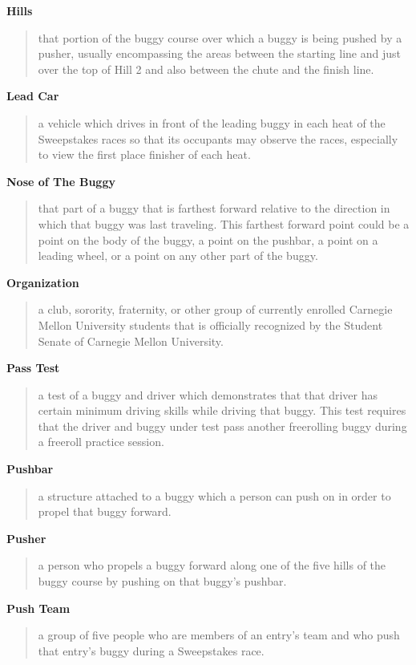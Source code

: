 \documentclass[openany]{book}
\begin{document}
\textbf{Hills}
\begin{quote}
	that portion of the buggy course over which a buggy is being pushed by a pusher, usually encompassing the areas between the starting line and just over the top of Hill 2 and also between the chute and the finish line.
\end{quote}

\textbf{Lead Car}
\begin{quote}
	a vehicle which drives in front of the leading buggy in each heat of the Sweepstakes races so that its occupants may observe the races, especially to view the first place finisher of each heat.
\end{quote}

\textbf{Nose of The Buggy}
\begin{quote}
	that part of a buggy that is farthest forward relative to the direction in which that buggy was last traveling. This farthest forward point could be a point on the body of the buggy, a point on the pushbar, a point on a leading wheel, or a point on any other part of the buggy.
\end{quote}

\textbf{Organization}
\begin{quote}
	a club, sorority, fraternity, or other group of currently enrolled Carnegie Mellon University students that is officially recognized by the Student Senate of Carnegie Mellon University.
\end{quote}

\textbf{Pass Test}
\begin{quote}
	a test of a buggy and driver which demonstrates that that driver has certain minimum driving skills while driving that buggy. This test requires that the driver and buggy under test pass another freerolling buggy during a freeroll practice session.
\end{quote}

\textbf{Pushbar}
\begin{quote}
	a structure attached to a buggy which a person can push on in order to propel that buggy forward.
\end{quote}

\textbf{Pusher}
\begin{quote}
	a person who propels a buggy forward along one of the five hills of the buggy course by pushing on that buggy's pushbar.
\end{quote}

\textbf{Push Team}
\begin{quote}
	a group of five people who are members of an entry's team and who push that entry's buggy during a Sweepstakes race.
\end{quote}
\end{document}
